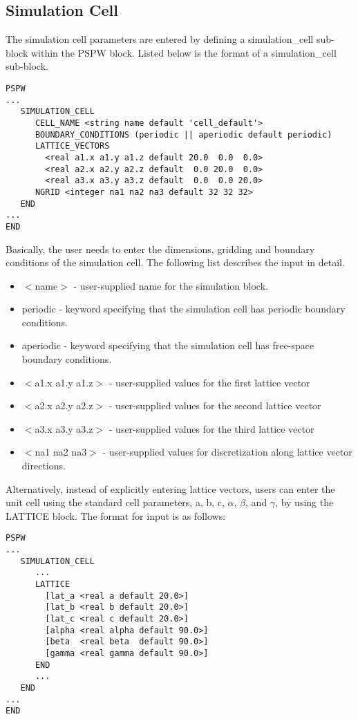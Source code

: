 \subsection{Simulation Cell}
\label{sec:pspw_cell}
The  simulation cell parameters
are entered by  defining a simulation\_cell sub-block within the PSPW 
block.  Listed below is the format of a simulation\_cell sub-block.
\begin{verbatim}
PSPW
...
   SIMULATION_CELL
      CELL_NAME <string name default 'cell_default'>
      BOUNDARY_CONDITIONS (periodic || aperiodic default periodic)
      LATTICE_VECTORS
        <real a1.x a1.y a1.z default 20.0  0.0  0.0>
        <real a2.x a2.y a2.z default  0.0 20.0  0.0>
        <real a3.x a3.y a3.z default  0.0  0.0 20.0>
      NGRID <integer na1 na2 na3 default 32 32 32>
   END
...
END
\end{verbatim}
Basically, the user needs to enter the dimensions, gridding and boundary
conditions of the simulation cell.  The following list describes the 
input in detail.
\begin{itemize}
        \item $<$name$>$ - user-supplied name for the simulation block.
        \item periodic - keyword specifying that the simulation cell 
                         has periodic boundary conditions.      
        \item aperiodic - keyword specifying that the simulation cell
                          has free-space boundary conditions. 
        \item $<$a1.x a1.y a1.z$>$ - user-supplied values for the first 
                                   lattice vector 
        \item $<$a2.x a2.y a2.z$>$ - user-supplied values for the second 
                                   lattice vector
        \item $<$a3.x a3.y a3.z$>$ - user-supplied values for the third 
                                   lattice vector
        \item $<$na1 na2 na3$>$ - user-supplied values for discretization 
                                along lattice vector directions.
\end{itemize}

Alternatively, instead of explicitly entering lattice vectors, users can
enter the unit cell using the standard cell parameters, a, b, c, $\alpha$, 
$\beta$, and $\gamma$, by using the LATTICE block.  The format for input
is as follows:
\begin{verbatim}
PSPW
...
   SIMULATION_CELL
      ...
      LATTICE
        [lat_a <real a default 20.0>]
        [lat_b <real b default 20.0>]
        [lat_c <real c default 20.0>]
        [alpha <real alpha default 90.0>]
        [beta  <real beta  default 90.0>]
        [gamma <real gamma default 90.0>]
      END
      ...
   END
...
END
\end{verbatim}


